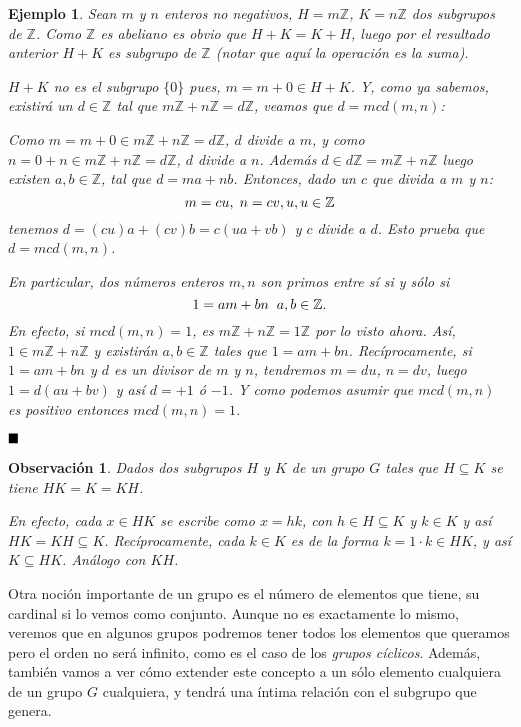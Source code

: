 \documentclass[12pt]{article}
\newtheorem{example}{Ejemplo}[theorem]
\newtheorem{observation}{Observación}[theorem]
\begin{document}
\begin{example}\label{ex:idBez} Sean $m$ y $n$ enteros no negativos, $H = m\mathbb{Z}$, $K = n\mathbb{Z}$ dos subgrupos de $\mathbb{Z}$. Como $\mathbb{Z}$ es abeliano es obvio que $H+K = K+H$, luego por el resultado anterior $H+K$ es subgrupo de $\mathbb{Z}$ (notar que aquí la operación es la suma).


$H+K$ no es el subgrupo $\lbrace 0 \rbrace$ pues, $m = m + 0 \in H + K$. Y, como ya sabemos, existirá un $d \in \mathbb{Z}$ tal que $m\mathbb{Z}+n\mathbb{Z} = d\mathbb{Z}$, veamos que $d = mcd(m,n)$:


Como $m = m + 0 \in m\mathbb{Z}+n\mathbb{Z} = d\mathbb{Z}$, $d$ divide a $m$, y como $n = 0 + n \in m\mathbb{Z}+n\mathbb{Z} = d\mathbb{Z}$, $d$ divide a $n$. Además $d \in d\mathbb{Z} = m\mathbb{Z} + n\mathbb{Z}$ luego existen $a,b \in \mathbb{Z}$, tal que $d = ma + nb$. Entonces, dado un $c$ que divida a $m$ y $n$:
$$m = cu,\hspace{0.1cm} n = cv, u, u \in \mathbb{Z}$$ tenemos $d = (cu)a + (cv)b = c(ua + vb)$ y $c$ divide a $d$. Esto prueba que $d = mcd(m,n)$. 

En particular, dos números enteros $m,n$ son primos entre sí si y sólo si $$1 = am + bn \hspace{0.2cm} a,b \in \mathbb{Z}.$$ En efecto, si $mcd(m,n) = 1$, es $m\mathbb{Z} + n\mathbb{Z} = 1\mathbb{Z}$ por lo visto ahora. Así, $1 \in m\mathbb{Z}+n\mathbb{Z}$ y existirán $a,b \in \mathbb{Z}$ tales que $1 = am + bn$. Recíprocamente, si $1 = am + bn$ y $d$ es un divisor de $m$ y $n$, tendremos $m = du$, $n = dv$, luego $1 = d(au + bv)$ y así $d = +1$ ó $-1$. Y como podemos asumir que $mcd(m,n)$ es positivo entonces $mcd(m,n) = 1$.
\end{example}

$\hfill \blacksquare$

\begin{observation} Dados dos subgrupos $H$ y $K$ de un grupo $G$ tales que $H \subseteq K$ se tiene $HK = K = KH$.

En efecto, cada $x \in HK$ se escribe como $x=hk$, con $h \in H \subseteq K$ y $k \in K$ y así $HK = KH \subseteq K$. Recíprocamente, cada $k \in K$ es de la forma $k  = 1 \cdot k \in HK$, y así $K \subseteq HK$. Análogo con $KH$.
\end{observation}

Otra noción importante de un grupo es el número de elementos que tiene, su cardinal si lo vemos como conjunto.  Aunque no es exactamente lo mismo, veremos que en algunos grupos podremos tener todos los elementos que queramos pero el orden no será infinito, como es el caso de los \textit{grupos cíclicos}. Además, también vamos a ver cómo extender este concepto a un sólo elemento cualquiera de un grupo $G$ cualquiera, y tendrá una íntima relación con el subgrupo que genera.
\end{document}
